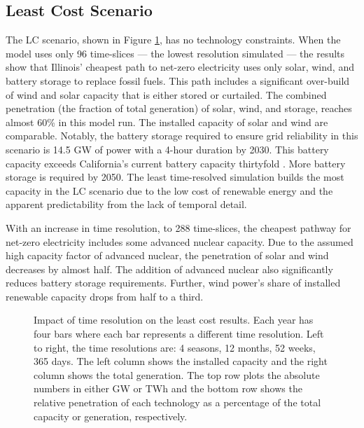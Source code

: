 \subsection{Least Cost Scenario}

The \gls{LC} scenario, shown in Figure \ref{fig:time_res_LC}, has no
technology constraints. When the model uses only 96 time-slices --- the lowest
resolution simulated --- the results show that Illinois' cheapest path to net-zero
electricity uses
only solar, wind, and battery storage to replace fossil fuels. This path includes
a significant over-build of wind and solar capacity that is either stored
or curtailed. The combined penetration (the fraction of total generation)
of solar, wind, and storage, reaches almost 60\% in this model run. The installed
capacity of solar and wind are comparable. Notably, the battery storage
required to ensure grid reliability in this scenario is 14.5 GW of power with
a 4-hour duration by 2030. This battery capacity exceeds California's current
battery capacity thirtyfold \cite{hutchins_us_2021}. More battery storage is
required by 2050. The least time-resolved simulation builds the most capacity in
the \gls{LC} scenario due to the low cost of renewable energy and the apparent
predictability from the lack of temporal detail.

With an increase in time resolution, to 288 time-slices, the cheapest pathway
for net-zero electricity includes some advanced nuclear capacity.
Due to the assumed high capacity factor of advanced nuclear, the penetration of
solar and wind decreases by almost half. The addition of advanced nuclear also significantly
reduces battery storage requirements. Further, wind power's share of installed renewable
capacity drops from half to a third.

\begin{figure}[H]
  \centering
  \resizebox{0.95\columnwidth}{!}{}
  \caption{Impact of time resolution on the least cost results. Each year has four bars where
  each bar represents a different time resolution. Left to right, the time resolutions are: 4
  seasons, 12 months, 52 weeks, 365 days.
  The left column shows the installed capacity and the right column shows the
  total generation. The top row plots the absolute numbers in either GW or TWh
  and the bottom row shows the relative penetration of each technology as a
  percentage of the total capacity or generation, respectively.}
  \label{fig:time_res_LC}
\end{figure}

